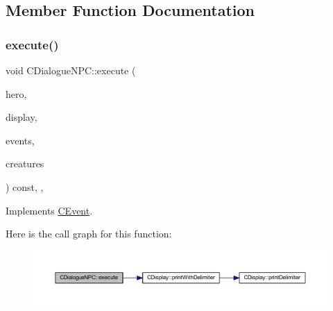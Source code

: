 \subsection{Member Function Documentation}
\mbox{\label{class_c_dialogue_n_p_c_a6a7d83e9c13789f6804a8b5323d572f8}} 
\subsubsection{\texorpdfstring{execute()}{execute()}}
{\footnotesize\ttfamily void C\+Dialogue\+N\+P\+C\+::execute (\begin{DoxyParamCaption}\item[{\mbox{\hyperlink{class_c_hero}{C\+Hero}} \&}]{hero,  }\item[{const \mbox{\hyperlink{class_c_display}{C\+Display}} \&}]{display,  }\item[{const std\+::map$<$ int, const \mbox{\hyperlink{class_c_event}{C\+Event}} $\ast$$>$ \&}]{events,  }\item[{const std\+::map$<$ int, const \mbox{\hyperlink{class_c_creature}{C\+Creature}} $\ast$$>$ \&}]{creatures }\end{DoxyParamCaption}) const\hspace{0.3cm}{\ttfamily [inline]}, {\ttfamily [override]}, {\ttfamily [virtual]}}



Implements \mbox{\hyperlink{class_c_event_a46bd2925f7f19c5c0d6adf2b1e6e3f70}{C\+Event}}.

Here is the call graph for this function\+:\nopagebreak
\begin{figure}[H]
\begin{center}
\leavevmode
\includegraphics[width=350pt]{class_c_dialogue_n_p_c_a6a7d83e9c13789f6804a8b5323d572f8_cgraph}
\end{center}
\end{figure}
\mbox{\label{class_c_dialogue_n_p_c_a1deb79509daa19585916a308c9b42e9c}} 
